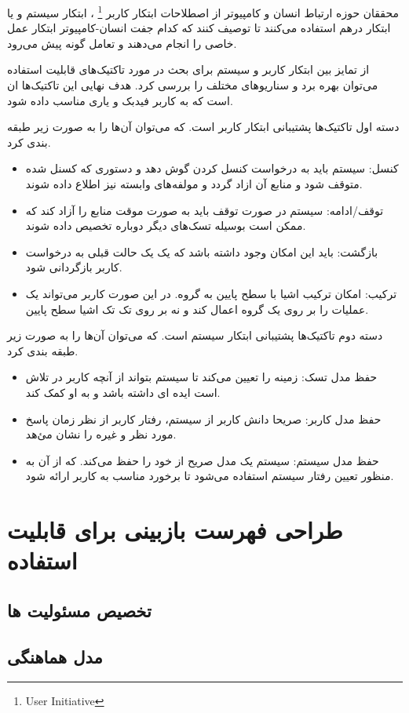 محققان حوزه ارتباط انسان و کامپیوتر از اصطلاحات ابتکار کاربر \footnote{User Initiative} ، ابتکار سیستم و یا ابتکار درهم استفاده می‌کنند تا توصیف کنند که کدام جفت انسان-کامپیوتر ابتکار عمل خاصی را انجام می‌دهند و تعامل گونه پیش‌ می‌رود.

از تمایز بین ابتکار کاربر و سیستم برای بحث در مورد تاکتیک‌های قابلیت استفاده می‌توان بهره برد و سناریوهای مختلف را بررسی کرد.
هدف نهایی این تاکتیک‌ها ان است که به کاربر فیدبک و یاری مناسب داده شود.

دسته اول تاکتیک‌ها پشتیبانی ابتکار کاربر است. که می‌توان آن‌ها را به صورت زیر طبقه بندی کرد.
\begin{itemize}
\item
کنسل: سیستم باید به درخواست کنسل کردن گوش دهد و دستوری که کسنل شده متوقف شود و منابع آن ازاد گردد و مولفه‌های وابسته نیز اطلاع داده شوند.
\item
توقف/ادامه: سیستم در صورت توقف باید به صورت موقت منابع را آزاد کند که ممکن است بوسیله تسک‌های دیگر دوباره تخصیص داده شوند.
\item
بازگشت: باید این امکان وجود داشته باشد که یک یک حالت قبلی به درخواست کاربر بازگردانی شود.
\item
ترکیب: امکان ترکیب اشیا با سطح پایین به گروه. در این صورت کاربر می‌تواند یک عملیات را بر روی یک گروه اعمال کند و نه بر روی تک تک اشیا سطح پایین.
\end{itemize}

دسته دوم تاکتیک‌ها پشتیبانی ابتکار سیستم است. که می‌توان آن‌ها را به صورت زیر طبقه بندی کرد.
\begin{itemize}
\item
حفظ مدل تسک: زمینه را تعیین می‌کند تا سیستم بتواند از آنچه کاربر در تلاش است ایده ای داشته باشد و به او کمک کند.
\item
حفظ مدل کاربر: صریحا دانش کاربر از سیستم، رفتار کاربر از نظر زمان پاسخ مورد نظر و غیره را نشان می‌ٔهد.
\item
حفظ مدل سیستم: سیستم یک مدل صریح از خود را حفظ می‌کند. که از آن به منظور تعیین رفتار سیستم استفاده می‌شود تا برخورد مناسب به کاربر ارائه شود.
\end{itemize}

\section{طراحی فهرست بازبینی برای قابلیت استفاده}
\subsection{تخصیص مسئولیت ها} 
\subsection{مدل هماهنگی}
